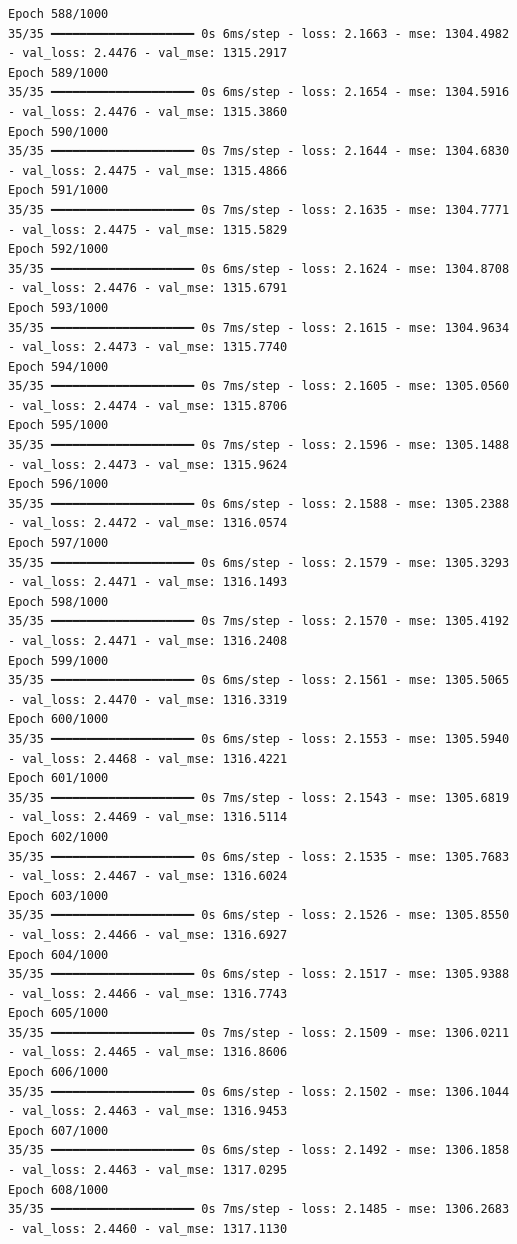 \documentclass[
  letterpaper,
  DIV=11,
  numbers=noendperiod]{scrreprt}
\begin{document}
\begin{verbatim}
Epoch 588/1000
35/35 ━━━━━━━━━━━━━━━━━━━━ 0s 6ms/step - loss: 2.1663 - mse: 1304.4982 - val_loss: 2.4476 - val_mse: 1315.2917
Epoch 589/1000
35/35 ━━━━━━━━━━━━━━━━━━━━ 0s 6ms/step - loss: 2.1654 - mse: 1304.5916 - val_loss: 2.4476 - val_mse: 1315.3860
Epoch 590/1000
35/35 ━━━━━━━━━━━━━━━━━━━━ 0s 7ms/step - loss: 2.1644 - mse: 1304.6830 - val_loss: 2.4475 - val_mse: 1315.4866
Epoch 591/1000
35/35 ━━━━━━━━━━━━━━━━━━━━ 0s 7ms/step - loss: 2.1635 - mse: 1304.7771 - val_loss: 2.4475 - val_mse: 1315.5829
Epoch 592/1000
35/35 ━━━━━━━━━━━━━━━━━━━━ 0s 6ms/step - loss: 2.1624 - mse: 1304.8708 - val_loss: 2.4476 - val_mse: 1315.6791
Epoch 593/1000
35/35 ━━━━━━━━━━━━━━━━━━━━ 0s 7ms/step - loss: 2.1615 - mse: 1304.9634 - val_loss: 2.4473 - val_mse: 1315.7740
Epoch 594/1000
35/35 ━━━━━━━━━━━━━━━━━━━━ 0s 7ms/step - loss: 2.1605 - mse: 1305.0560 - val_loss: 2.4474 - val_mse: 1315.8706
Epoch 595/1000
35/35 ━━━━━━━━━━━━━━━━━━━━ 0s 7ms/step - loss: 2.1596 - mse: 1305.1488 - val_loss: 2.4473 - val_mse: 1315.9624
Epoch 596/1000
35/35 ━━━━━━━━━━━━━━━━━━━━ 0s 6ms/step - loss: 2.1588 - mse: 1305.2388 - val_loss: 2.4472 - val_mse: 1316.0574
Epoch 597/1000
35/35 ━━━━━━━━━━━━━━━━━━━━ 0s 6ms/step - loss: 2.1579 - mse: 1305.3293 - val_loss: 2.4471 - val_mse: 1316.1493
Epoch 598/1000
35/35 ━━━━━━━━━━━━━━━━━━━━ 0s 7ms/step - loss: 2.1570 - mse: 1305.4192 - val_loss: 2.4471 - val_mse: 1316.2408
Epoch 599/1000
35/35 ━━━━━━━━━━━━━━━━━━━━ 0s 6ms/step - loss: 2.1561 - mse: 1305.5065 - val_loss: 2.4470 - val_mse: 1316.3319
Epoch 600/1000
35/35 ━━━━━━━━━━━━━━━━━━━━ 0s 6ms/step - loss: 2.1553 - mse: 1305.5940 - val_loss: 2.4468 - val_mse: 1316.4221
Epoch 601/1000
35/35 ━━━━━━━━━━━━━━━━━━━━ 0s 7ms/step - loss: 2.1543 - mse: 1305.6819 - val_loss: 2.4469 - val_mse: 1316.5114
Epoch 602/1000
35/35 ━━━━━━━━━━━━━━━━━━━━ 0s 6ms/step - loss: 2.1535 - mse: 1305.7683 - val_loss: 2.4467 - val_mse: 1316.6024
Epoch 603/1000
35/35 ━━━━━━━━━━━━━━━━━━━━ 0s 6ms/step - loss: 2.1526 - mse: 1305.8550 - val_loss: 2.4466 - val_mse: 1316.6927
Epoch 604/1000
35/35 ━━━━━━━━━━━━━━━━━━━━ 0s 6ms/step - loss: 2.1517 - mse: 1305.9388 - val_loss: 2.4466 - val_mse: 1316.7743
Epoch 605/1000
35/35 ━━━━━━━━━━━━━━━━━━━━ 0s 7ms/step - loss: 2.1509 - mse: 1306.0211 - val_loss: 2.4465 - val_mse: 1316.8606
Epoch 606/1000
35/35 ━━━━━━━━━━━━━━━━━━━━ 0s 6ms/step - loss: 2.1502 - mse: 1306.1044 - val_loss: 2.4463 - val_mse: 1316.9453
Epoch 607/1000
35/35 ━━━━━━━━━━━━━━━━━━━━ 0s 6ms/step - loss: 2.1492 - mse: 1306.1858 - val_loss: 2.4463 - val_mse: 1317.0295
Epoch 608/1000
35/35 ━━━━━━━━━━━━━━━━━━━━ 0s 7ms/step - loss: 2.1485 - mse: 1306.2683 - val_loss: 2.4460 - val_mse: 1317.1130

\end{verbatim}
\end{document}
